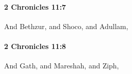 		\paragraph{2 Chronicles 11:7} %
			\label{2CHRONICLES-11-7}

			And Bethzur, and Shoco, and Adullam,


		\paragraph{2 Chronicles 11:8} %
			\label{2CHRONICLES-11-8}

			And Gath, and Mareshah, and Ziph,



